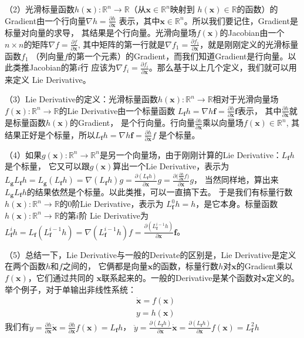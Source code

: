 \documentclass{article}
\begin{document}
（2）光滑标量函数$h(\textbf{x}):\mathbb{R}^n\rightarrow\mathbb{R}$（从$\textbf{x}\in\mathbb{R}^n$映射到
$h(\textbf{x})\in\mathbb{R}$的函数）的Gradient由一个行向量$\nabla{h}=\frac{\partial{h}}{\partial{\textbf{x}}}$
表示，其中$\textbf{x}\in\mathbb{R}^n$。所以我们要记住，Gradient是标量对向量的求导，
其结果是个行向量。光滑向量场$f(\textbf{x})$的Jacobian由一个$n\times{n}$的矩阵$\nabla{f}=\frac{\partial{f}}{\partial{\textbf{x}}}$,
其中矩阵的第一行就是$\nabla{f_1}=\frac{\partial{f_1}}{\partial{\textbf{x}}}$，就是刚刚定义的光滑标量函数$f_1$
（列向量$f$的第一个元素）的Gradient，而我们知道Gradient是行向量。以此类推Jacobian的第$i$行
应该为$\nabla{f_i}=\frac{\partial{f_i}}{\partial{\textbf{x}}}$。那么基于以上几个定义，我们就可以用来定义
Lie Derivative。\par

（3）Lie Derivative的定义：光滑标量函数$h(\textbf{x}):\mathbb{R}^n\rightarrow\mathbb{R}$相对于光滑向量场
$f(\textbf{x}):\mathbb{R}^n\rightarrow\mathbb{R}$的Lie Derivative由一个标量函数
$L_\textbf{f}h=\nabla{h}\textbf{f}=\frac{\partial{h}}{\partial{\textbf{x}}}\textbf{f}$表示，
其中$\frac{\partial{h}}{\partial{\textbf{x}}}$就是标量函数$h(\textbf{x})$的Gradient，
是个行向量。行向量$\frac{\partial{h}}{\partial{\textbf{x}}}$乘以向量场$f(\textbf{x})\in\mathbb{R}^n$,
其结果正好是个标量，所以$L_\textbf{f}h=\nabla{h}\textbf{f}=\frac{\partial{h}}{\partial{\textbf{x}}}f$
是个标量。\par

（4）如果$g(\textbf{x}):\mathbb{R}^n\rightarrow\mathbb{R}^n$是另一个向量场，由于刚刚计算的Lie Derivative：$L_\textbf{f}h$是个标量，
它又可以跟$g(\textbf{x})$算出一个Lie Derivative，表示为
$L_\textbf{g}L_\textbf{f}h=L_\textbf{g}(L_\textbf{f}h)=\nabla(L_\textbf{f}h)g=\frac{\partial(L_\textbf{f}h)}{\partial{\textbf{x}}}g
=\frac{\partial({\frac{\partial{h}}{\partial{\textbf{x}}}f)}}{\partial{\textbf{x}}}g$，
当然同样地，算出来$L_\textbf{g}L_\textbf{f}h$的结果依然是个标量。以此类推，可以一直搞下去。
于是我们有标量行数$h(\textbf{x}):\mathbb{R}^n\rightarrow\mathbb{R}$的0阶Lie Derivative，表示为
$L_\textbf{f}^0h=h$，是它本身。标量函数$h(\textbf{x}):\mathbb{R}^n\rightarrow\mathbb{R}$的第$i$阶
Lie Derivative为$L_\textbf{f}^ih=L_\textbf{f}(L_\textbf{f}^{i-1}h)=\nabla(L_{\textbf{f}}^{i-1}h)f=\frac{\partial(L_{\textbf{f}}^{i-1}h)}{\partial{\textbf{x}}}\textbf{f}$。\par
（5）总结一下，Lie Derivative与一般的Derivate的区别是，Lie Derivative是定义在两个函数$h$和$f$之间的，
它俩都是向量$\textbf{x}$的函数，标量行数$h$对$\textbf{x}$的Gradient乘以$f(\textbf{x})$，它们通过共同的
$\textbf{x}$联系起来的。一般的Derivative是某个函数对$\textbf{x}$定义的。举个例子，对于单输出非线性系统：
\begin{equation}
\begin{aligned}
    &\dot{\textbf{x}}=f(\textbf{x})\\
    &y=h(\textbf{x})
\end{aligned}
\end{equation}
我们有$\dot{y}=\frac{\partial{h}}{\partial{\textbf{x}}}\dot{\textbf{x}}=\frac{\partial{h}}{\partial{\textbf{x}}}f(\textbf{x})=L_\textbf{f}h$，
$\ddot{y}=\frac{\partial(L_\textbf{f}h)}{\partial{\textbf{x}}}\dot{\textbf{x}}=\frac{\partial(L_{\textbf{f}}h)}{\partial{\textbf{x}}}f(\textbf{x})=L_{\textbf{f}}^{2}h$
\end{document}
